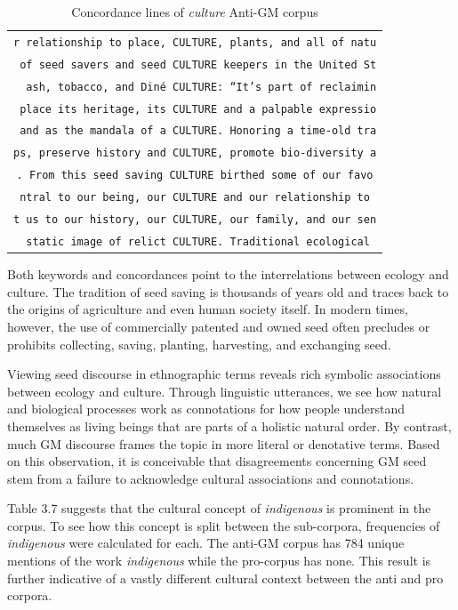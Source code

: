 \begin{table}[h]
\begin{footnotesize}
\begin{tabular}{c}
\texttt{r relationship to place, CULTURE, plants, and all of natu} \\
\texttt{ of seed savers and seed CULTURE keepers in the United St} \\
\texttt{\ \ ash, tobacco, and Din\'e CULTURE: ``It's part of reclaimin} \\
\texttt{ place its heritage, its CULTURE and a palpable expressio} \\
\texttt{ and as the mandala of a CULTURE. Honoring a time-old tra} \\
\texttt{ps, preserve history and CULTURE, promote bio-diversity a} \\
\texttt{. From this seed saving CULTURE birthed some of our favo} \\
\texttt{ntral to our being, our CULTURE and our relationship to} \\
\texttt{t us to our history, our CULTURE, our family, and our sen} \\
\texttt{ static image of relict CULTURE. Traditional ecological} \\ 

 \end{tabular}
\caption{Concordance lines of \textit{culture} Anti-GM corpus}
\label{tab:table1}
\end{footnotesize}
\end{table}

Both keywords and concordances point to the interrelations between ecology and culture. The tradition of seed saving is thousands of years old and traces back to the origins of agriculture and even human society itself. In modern times, however, the use of commercially patented and owned seed often precludes or prohibits collecting, saving, planting, harvesting, and exchanging seed.

Viewing seed discourse in ethnographic terms reveals rich symbolic associations between ecology and culture. Through linguistic utterances, we see how natural and biological processes work as connotations for how people understand themselves as living beings that are parts of a holistic natural order. By contrast, much GM discourse frames the topic in more literal or denotative terms. Based on this observation, it is conceivable that disagreements concerning GM seed stem from a failure to acknowledge cultural associations and connotations. 

Table 3.7 suggests that the cultural concept of \textit{indigenous} is prominent in the corpus. To see how this concept is split between the sub-corpora, frequencies of \textit{indigenous} were calculated for each. The anti-GM corpus has 784 unique mentions of the work \textit{indigenous} while the pro-corpus has none. This result is further indicative of a vastly different cultural context between the anti and pro corpora. 

